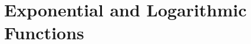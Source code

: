 \documentclass[../../main.tex]{subfiles}
\begin{document}
\chapter{Exponential and Logarithmic Functions}
\end{document}
